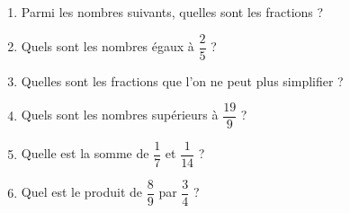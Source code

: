 \begin{activite}[Q.C.M.]
\begin{enumerate}
\item Parmi les nombres suivants, quelles sont les fractions ?
\item Quels sont les nombres égaux à $\dfrac{2}{5}$ ?
\item Quelles sont les fractions que l'on ne peut plus simplifier ?
\item  Quels sont les nombres supérieurs à $\dfrac{19}{9}$ ?
\item  Quelle est la somme de $\dfrac{1}{7}$ et $\dfrac{1}{14}$ ?
\item  Quel est le produit de $\dfrac{8}{9}$ par $\dfrac{3}{4}$ ?
\end{enumerate}
\end{activite}




